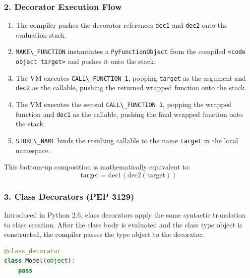 \hypertarget{decorator-execution-flow}{%
\subsubsection{2. Decorator Execution
Flow}\label{decorator-execution-flow}}

\begin{enumerate}
\def\labelenumi{\arabic{enumi}.}
\tightlist
\item
  The compiler pushes the decorator references
  \passthrough{\lstinline!dec1!} and \passthrough{\lstinline!dec2!} onto
  the evaluation stack.
\item
  \passthrough{\lstinline!MAKE\_FUNCTION!} instantiates a
  \passthrough{\lstinline!PyFunctionObject!} from the compiled
  \passthrough{\lstinline!<code object target>!} and pushes it onto the
  stack.
\item
  The VM executes \passthrough{\lstinline!CALL\_FUNCTION 1!}, popping
  \passthrough{\lstinline!target!} as the argument and
  \passthrough{\lstinline!dec2!} as the callable, pushing the returned
  wrapped function onto the stack.
\item
  The VM executes the second \passthrough{\lstinline!CALL\_FUNCTION 1!},
  popping the wrapped function and \passthrough{\lstinline!dec1!} as the
  callable, pushing the final wrapped function onto the stack.
\item
  \passthrough{\lstinline!STORE\_NAME!} binds the resulting callable to
  the name \passthrough{\lstinline!target!} in the local namespace.
\end{enumerate}

This bottom-up composition is mathematically equivalent to:
\[\text{target} = \text{dec1}\left(\text{dec2}\left(\text{target}\right)\right)\]

\hypertarget{class-decorators-pep-3129}{%
\subsubsection{3. Class Decorators (PEP
3129)}\label{class-decorators-pep-3129}}

Introduced in Python 2.6, class decorators apply the same syntactic
translation to class creation. After the class body is evaluated and the
class type object is constructed, the compiler passes the type object to
the decorator:

\begin{lstlisting}[language=Python]
@class_decorator
class Model(object):
    pass
\end{lstlisting}

